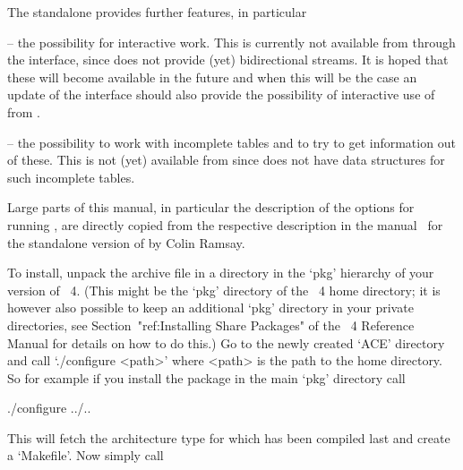 The  {\ACE} standalone  provides further  features, in  particular 

\beginlist

\item{--} the possibility for  interactive work. This is currently not
available  from {\GAP} through  the interface,  since {\GAP}  does not
provide  (yet) bidirectional  streams.  It is  hoped  that these  will
become  available in  the future  and when  this will  be the  case an
update  of  the  interface  should  also provide  the  possibility  of
interactive use of {\ACE} from {\GAP}.

\item{--} the possibility to work with incomplete tables and to try to
get information out of these.  This is not (yet) available from {\GAP}
since {\GAP} does not have data structures for such incomplete tables.

\endlist




Large parts of  this manual, in particular      the description of the
options for  running {\ACE}, are  directly copied from  the respective
description in  the manual~\cite{Ram99} for the  standalone version of
{\ACE} by Colin Ramsay.



To  install, unpack  the  archive file  in  a directory  in the  `pkg'
hierarchy  of your  version  of  {\GAP}~4. (This  might  be the  `pkg'
directory of the {\GAP}~4 home  directory; it is however also possible
to keep an additional `pkg' directory in your private directories, see
Section~"ref:Installing  Share Packages"  of  the {\GAP}~4   Reference
Manual for details  on how to do this.) Go to  the newly created `ACE'
directory and  call `./configure <path>'  where <path> is the  path to
the {\GAP} home  directory. So for example if  you install the package
in the main `pkg' directory call

\begintt
./configure ../..
\endtt

This  will fetch  the  architecture  type for  which  {\GAP} has  been
compiled last and create a `Makefile'. Now simply call

